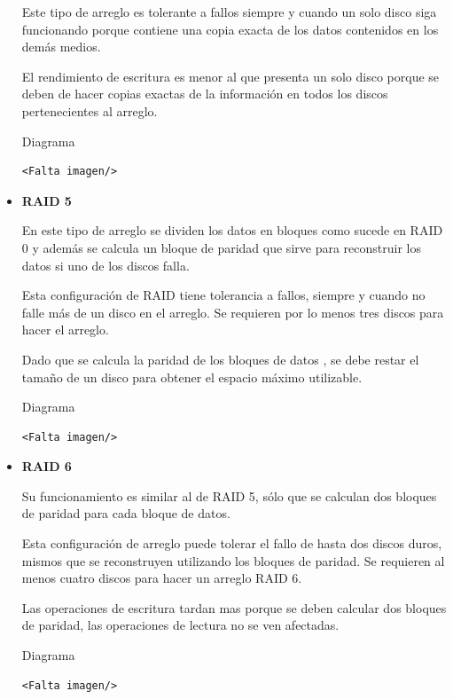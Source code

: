 \begin{itemize}
Este tipo de arreglo es tolerante a fallos siempre y cuando un solo disco siga funcionando porque contiene una copia exacta de los datos contenidos en los dem\'{a}s medios.

El rendimiento de escritura es menor al que presenta un solo disco porque se deben de hacer copias exactas de la informaci\'{o}n en todos los discos pertenecientes al arreglo.

Diagrama \cite{0a250ce04fb10680f70cb2c3efd365b1}
{\large\begin{verbatim}<Falta imagen/>\end{verbatim}}

  \item \textbf{RAID 5}

En este tipo de arreglo se dividen los datos en bloques como sucede en RAID 0 y adem\'{a}s se calcula un bloque de paridad que sirve para reconstruir los datos si uno de los discos falla.

Esta configuraci\'{o}n de RAID tiene tolerancia a fallos, siempre y cuando no falle m\'{a}s de un disco en el arreglo. Se requieren por lo menos tres discos para hacer el arreglo.

Dado que se calcula la paridad de los bloques de datos , se debe restar el tama\~{n}o de un disco para obtener el espacio m\'{a}ximo utilizable.
  
Diagrama \cite{9397b15f6a384de60446b869f05412af}
{\large\begin{verbatim}<Falta imagen/>\end{verbatim}}

  \item \textbf{RAID 6}

Su funcionamiento es similar al de RAID 5, s\'{o}lo que se calculan dos bloques de paridad para cada bloque de datos.

Esta configuraci\'{o}n de arreglo puede tolerar el fallo de hasta dos discos duros, mismos que se reconstruyen utilizando los bloques de paridad. Se requieren al menos cuatro discos para hacer un arreglo RAID 6.

Las operaciones de escritura tardan mas porque se deben calcular dos bloques de paridad, las operaciones de lectura no se ven afectadas.
  
Diagrama \cite{9e2f3e1ba21ce971703a62c6217946ae}
{\large\begin{verbatim}<Falta imagen/>\end{verbatim}}
  
\end{itemize}

